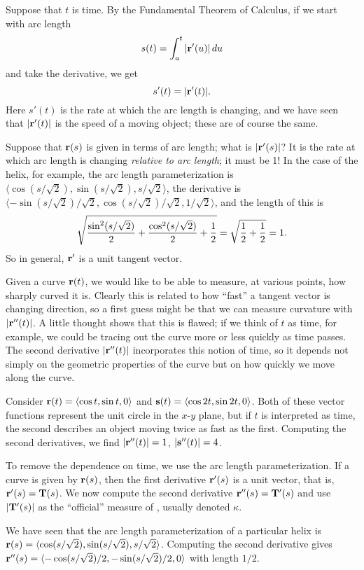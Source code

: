 Suppose that $t$ is time.
By the Fundamental Theorem of Calculus, if we start with
arc length
$$s(t)=\int_a^t |{\bf r}'(u)|\,du$$
and take the derivative, we get
$$s'(t)=|{\bf r}'(t)|.$$
Here $s'(t)$ is the rate at which the arc length is changing, and
we have seen that $|{\bf r}'(t)|$ is the speed of a moving object;
these are of course the same.

Suppose that ${\bf r}(s)$ is given in terms of arc length; what is
$|{\bf r}'(s)|$? It is the rate at which arc length is changing
\emph{relative to arc length}; it must be 1! In the case of the helix, for
example, the arc length parameterization is $\langle
\cos(s/\sqrt2),\sin(s/\sqrt2),s/\sqrt2\rangle$, the derivative is
$\langle -\sin(s/\sqrt2)/\sqrt2,\cos(s/\sqrt2)/\sqrt2,1/\sqrt2\rangle$,
and the length of this is
$$\sqrt{{\sin^2(s/\sqrt2)\over2}+{\cos^2(s/\sqrt2)\over2}+{1\over2}}=
\sqrt{{1\over2}+{1\over2}}=1.$$
So in general, ${\bf r}'$ is a unit tangent vector.

Given a curve ${\bf r}(t)$, we would like to be able to measure, at
various points, how sharply curved it is. Clearly this is related to
how ``fast'' a tangent vector is changing direction, so a first guess
might be that we can measure curvature with $|{\bf r}''(t)|$. A little
thought shows that this is flawed; if we think of $t$ as time, for
example, we could be tracing out the curve more or less quickly
as time passes. The second derivative $|{\bf r}''(t)|$ incorporates
this notion of time, so it depends not simply on the geometric
properties of the curve but on how quickly we move along the curve.

\begin{example}{}{}
Consider ${\bf r}(t)=\langle \cos t,\sin t,0\rangle$ and 
${\bf s}(t)=\langle \cos 2t,\sin 2t,0\rangle$. Both of these vector
functions represent the unit circle in the $x$-$y$ plane, but if $t$
is interpreted as time, the second describes an object moving twice as
fast as the first. Computing the second derivatives, we find
$|{\bf r}''(t)|=1$, $|{\bf s}''(t)|=4$.
\end{example}

To remove the dependence on time, we use the arc length
parameterization. If a curve is given by ${\bf r}(s)$, then the first
derivative ${\bf r}'(s)$ is a unit vector, that is, 
${\bf r}'(s)={\bf T}(s)$. We now compute the second derivative
${\bf r}''(s)={\bf T}'(s)$ and use  $|{\bf T}'(s)|$ as the
``official'' measure of 
, usually denoted $\kappa$.

\begin{example}{}{}
We have seen that the arc length parameterization of a 
particular helix is ${\bf r}(s)=
\langle \cos(s/\sqrt2),\sin(s/\sqrt2),s/\sqrt2\rangle$.
Computing the second derivative gives
${\bf r}''(s)=
\langle -\cos(s/\sqrt2)/2,-\sin(s/\sqrt2)/2,0\rangle$ with length $1/2$.
\end{example}

